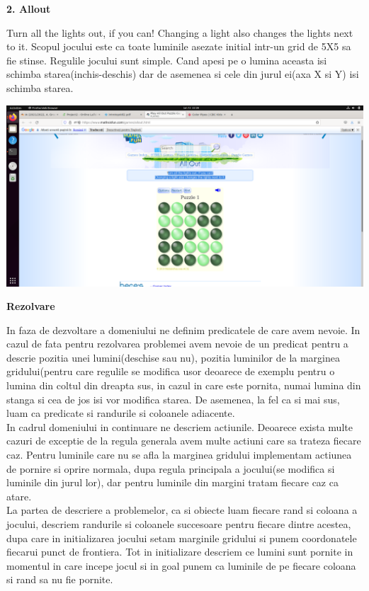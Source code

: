 \documentclass[a4paper,12pt]{report}
\begin{document}
\begin{Large}
 \textbf{2. Allout}\\
\end{Large}
Turn all the lights out, if you can!
Changing a light also changes the lights next to it.
Scopul jocului este ca toate luminile asezate initial intr-un grid de 5X5 sa fie stinse. Regulile jocului sunt simple. Cand apesi pe o lumina aceasta isi schimba starea(inchis-deschis) dar de asemenea si cele din jurul ei(axa X si Y) isi schimba starea.

\includegraphics[width=150mm,scale=0.5]{out.png}\\
\begin{Large}
 \textbf{Rezolvare}\\
\end{Large}
In faza de dezvoltare a domeniului ne definim predicatele de care avem nevoie. In cazul de fata pentru rezolvarea problemei avem nevoie de un predicat pentru a descrie pozitia unei lumini(deschise sau nu), pozitia luminilor de la marginea gridului(pentru care regulile se modifica usor deoarece de exemplu pentru o lumina din coltul din dreapta sus, in cazul in care este pornita, numai lumina din stanga si cea de jos isi vor modifica starea. De asemenea, la fel ca si mai sus, luam ca predicate si randurile si coloanele adiacente.\\
In cadrul domeniului in continuare ne descriem actiunile. Deoarece exista multe cazuri de exceptie de la regula generala avem multe actiuni care sa trateza fiecare caz. Pentru luminile care nu se afla la marginea gridului implementam actiunea de pornire si oprire normala, dupa regula principala a jocului(se modifica si luminile din jurul lor), dar pentru luminile din margini tratam fiecare caz ca atare.\\
La partea de descriere a problemelor, ca si obiecte luam fiecare rand si coloana a jocului, descriem randurile si coloanele succesoare pentru fiecare dintre acestea, dupa care in initializarea jocului setam marginile gridului si punem coordonatele fiecarui punct de frontiera. Tot in initializare descriem ce lumini sunt pornite in momentul in care incepe jocul si in goal punem ca luminile de pe fiecare coloana si rand sa nu fie pornite.
\end{document}
